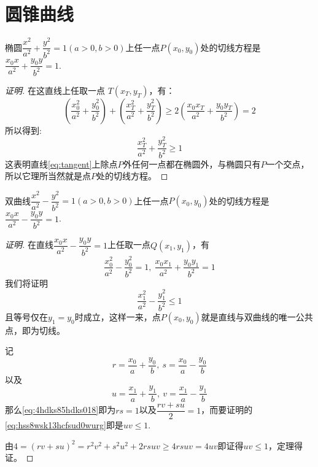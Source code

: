 
\section{圆锥曲线}
\label{sec:conic-section}

\begin{theorem}
  椭圆$\dfrac{x^2}{a^2}+\dfrac{y^2}{b^2}=1(a>0,b>0)$上任一点$P(x_0,y_0)$处的切线方程是$\dfrac{x_0x}{a^2}+\dfrac{y_0y}{b^2}=1$.
\end{theorem}

\begin{proof}[证明]
在这直线上任取一点 $T(x_T,y_T)$，有：
\begin{equation}
(\frac{x_0^2}{a^2}+\frac{y_0^2}{b^2})+(\frac{x_T^2}{a^2}+\frac{y_T^2}{b^2}) \geqslant 2(\frac{x_0x_T}{a^2}+\frac{y_0y_T}{b^2})=2
\end{equation}
所以得到:
\begin{equation}
\frac{x_T^2}{a^2}+\frac{y_T^2}{b^2} \geqslant 1
\end{equation}
这表明直线\ref{eq:tangent}上除点$P$外任何一点都在椭圆外，与椭圆只有$P$一个交点，所以它理所当然就是点$P$处的切线方程。
\end{proof}

\begin{theorem}
  双曲线$\dfrac{x^2}{a^2}-\dfrac{y^2}{b^2}=1(a>0,b>0)$上任一点$P(x_0,y_0)$处的切线方程是$\dfrac{x_0x}{a^2}-\dfrac{y_0y}{b^2}=1$.
\end{theorem}

\begin{proof}[证明]
  在直线$\dfrac{x_0x}{a^2}-\dfrac{y_0y}{b^2}=1$上任取一点$Q(x_1,y_1)$，有
  \begin{equation}
    \label{eq:4hdks85hdks018}
   \frac{x_0^2}{a^2}-\frac{y_0^2}{b^2}=1, \  \frac{x_0x_1}{a^2}+\frac{y_0y_1}{b^2}=1 
  \end{equation}
  我们将证明
  \begin{equation}
    \label{eq:hss8wsk13hcfsud0wurg}
    \frac{x_1^2}{a^2}-\frac{y_1^2}{b^2} \leqslant 1  
  \end{equation}
  且等号仅在$y_1=y_0$时成立，这样一来，点$P(x_0,y_0)$就是直线与双曲线的唯一公共点，即为切线。

  记
  \[ r=\frac{x_0}{a}+\frac{y_0}{b}, \  s=\frac{x_0}{a}-\frac{y_0}{b} \]
  以及
  \[ u=\frac{x_1}{a}+\frac{y_1}{b}, \  v=\frac{x_1}{a}-\frac{y_1}{b} \]
  那么\autoref{eq:4hdks85hdks018}即为$rs=1$以及$\dfrac{rv+su}{2}=1$，而要证明的\autoref{eq:hss8wsk13hcfsud0wurg}即是$uv\leqslant 1$.

  由$4=(rv+su)^2=r^2v^2+s^2u^2+2rsuv \geqslant 4rsuv= 4uv$即证得$uv \leqslant 1$，定理得证。
\end{proof}

